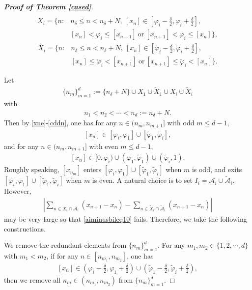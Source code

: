 \documentclass[12pt]{amsart}
\newcommand{\abs}[1]{\left\lvert #1 \right\rvert}
\theoremstyle{plain}
\theoremstyle{definition}
\begin{document}
\begin{proof}[\textbf{Proof of Theorem \ref{cased}}]
\begin{align}
		 	\end{align}
		 	\begin{align}
		\label{definitionofXi}X_i={\Bigg\{}n: & n_\delta\leq n< n_\delta+N,\ [x_n]\in\left[\varphi_i-\frac{\delta}{2},\varphi_i+\frac{\delta}{2}\right],\\
		&[x_n]< \varphi_i\leq [x_{n+1}]\ \mathrm{or}\ [x_{n+1}]< \varphi_i\leq [x_n]{\Bigg\}},\nonumber
	\end{align}
	\begin{align}
		\label{definitionofXitilde}\tilde{X}_i={\Bigg\{}n: & n_\delta\leq n< n_\delta+N,\ [x_n]\in\left[\tilde{\varphi}_i-\frac{\delta}{2},\tilde{\varphi}_i+\frac{\delta}{2}\right],\\
		&[x_n]\leq \tilde{\varphi}_i< [x_{n+1}]\ \mathrm{or}\ [x_{n+1}]\leq \tilde{\varphi}_i< [x_n]{\Bigg\}}\nonumber.
	\end{align}
	

Let 
\begin{align}
	\{n_m\}_{m=1}^d:=\{n_\delta+N\}\cup X_1\cup \tilde{X}_1\cup X_i\cup \tilde{X}_i\label{cdnm1d}
\end{align}
with 
\begin{align}
	n_1<n_2<\cdots<n_d:=n_\delta+N.\label{cddn}
\end{align}
Then by \eqref{xne}-\eqref{cddn}, one has for any $n\in(n_m,n_{m+1}]$ with odd $m\leq d-1$, 
\begin{align}
	\left[x_n\right]\in [\varphi_i,\varphi_1]\cup [\tilde{\varphi}_1,\tilde{\varphi}_i],
\end{align}
and for any $n\in(n_m,n_{m+1}]$ with even $m\leq d-1$,
\begin{align}
	\left[x_n\right]\in [0,\varphi_i)\cup (\varphi_1,\tilde{\varphi}_1)\cup (\tilde{\varphi}_i,1).\label{evenbefore}
\end{align}
Roughly speaking, $\left[x_{n_m}\right]$ enters  $[\varphi_i,\varphi_1]\cup[\tilde{\varphi}_1,\tilde{\varphi}_i]$ when $m$ is odd, and exits  $[\varphi_i,\varphi_1]\cup[\tilde{\varphi}_1,\tilde{\varphi}_i]$ when $m$ is even. 	A natural choice is to set $I_i=\mathcal{A}_i\cup\tilde{\mathcal{A}}_i$. However, 
\begin{align}
\abs{\sum_{n\in X_i\cap \mathcal{A}_i}(x_{n+1}-x_n)-\sum_{n\in \tilde{X}_i\cap\tilde{\mathcal{A}}_i}(x_{n+1}-x_n)}\nonumber
\end{align}
may be very large so that \eqref{aiminusbileq10} fails. Therefore, we take the following constructions.

We remove the redundant elements from $\{n_m\}_{m=1}^d$. For any $m_1,m_2\in \{1,2,\cdots,d\}$ with $m_1<m_2$, if for any $n\in[n_{m_1},n_{m_2}]$, one has 
\begin{align}
	\left[x_{n}\right]\in \left(\varphi_i-\frac{\delta}{2},\varphi_1+\frac{\delta}{2}\right)\cup\left(\tilde{\varphi}_1-\frac{\delta}{2},\tilde{\varphi}_i+\frac{\delta}{2}\right),\nonumber
\end{align}then we remove all $n_m\in (n_{m_1},n_{m_2})$ from $\{n_m\}_{m=1}^d$. 


\end{proof}
\end{document}
